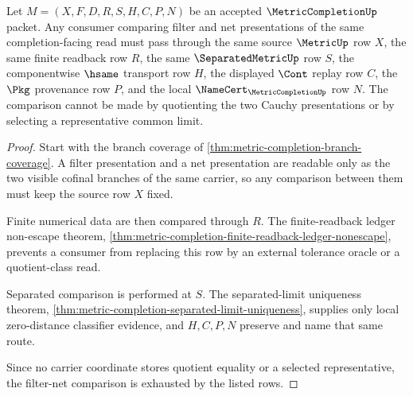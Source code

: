 \begin{theorem}
\label{thm:metric-completion-filter-net-compatibility}
Let $M=(X,F,D,R,S,H,C,P,N)$ be an accepted $\MetricCompletionUp$ packet. Any consumer comparing filter and net presentations of the same completion-facing read must pass through the same source $\MetricUp$ row $X$, the same finite readback row $R$, the same $\SeparatedMetricUp$ row $S$, the componentwise $\hsame$ transport row $H$, the displayed $\Cont$ replay row $C$, the $\Pkg$ provenance row $P$, and the local $\NameCert_{\MetricCompletionUp}$ row $N$. The comparison cannot be made by quotienting the two Cauchy presentations or by selecting a representative common limit.
\end{theorem}
\begin{proof}
Start with the branch coverage of \autoref{thm:metric-completion-branch-coverage}. A filter presentation and a net presentation are readable only as the two visible cofinal branches of the same carrier, so any comparison between them must keep the source row $X$ fixed.

Finite numerical data are then compared through $R$. The finite-readback ledger non-escape theorem, \autoref{thm:metric-completion-finite-readback-ledger-nonescape}, prevents a consumer from replacing this row by an external tolerance oracle or a quotient-class read.

Separated comparison is performed at $S$. The separated-limit uniqueness theorem, \autoref{thm:metric-completion-separated-limit-uniqueness}, supplies only local zero-distance classifier evidence, and $H,C,P,N$ preserve and name that same route.

Since no carrier coordinate stores quotient equality or a selected representative, the filter-net comparison is exhausted by the listed rows.
\end{proof}

